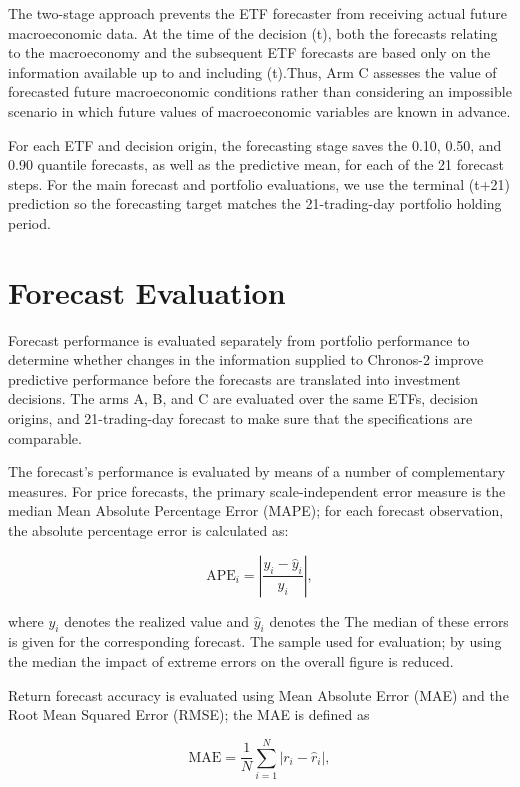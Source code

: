 \documentclass[12pt,a4paper,twoside,openany]{book}
\begin{document}
The two-stage approach prevents the ETF forecaster from receiving actual future macroeconomic data. At the time of the decision (t), both the forecasts relating to the macroeconomy and the subsequent ETF forecasts are based only on the information available up to and including (t).Thus, Arm C assesses the value of forecasted future macroeconomic conditions rather than considering an impossible scenario in which future values of macroeconomic variables are known in advance.


For each ETF and decision origin, the forecasting stage saves the 0.10, 0.50, and 0.90 quantile forecasts, as well as the predictive mean, for each of the 21 forecast steps. For the main forecast and portfolio evaluations, we use the terminal (t+21) prediction so the forecasting target matches the 21-trading-day portfolio holding period.


\section{Forecast Evaluation}\label{forecast-evaluation}

Forecast performance is evaluated separately from portfolio performance
to determine whether changes in the information supplied to
Chronos-2 improve predictive performance before the forecasts are
translated into investment decisions. The arms A, B, and C are evaluated
over the same ETFs, decision origins, and 21-trading-day forecast
to make sure that the specifications are comparable.

The forecast's performance is evaluated by means of a number of complementary measures.
For price forecasts, the primary scale-independent error measure is the
median Mean Absolute Percentage Error (MAPE); for each forecast
observation, the absolute percentage error is calculated as:

\[
\mathrm{APE}_{i}
=
\left|
\frac{y_i-\hat{y}_i}{y_i}
\right|,
\]

where \(y_i\) denotes the realized value and \(\hat{y}_i\) denotes the
The median of these errors is given for the corresponding forecast.
The sample used for evaluation; by using the median the impact of
extreme errors on the overall figure is reduced.

Return forecast accuracy is evaluated using Mean Absolute Error (MAE)
and the Root Mean Squared Error (RMSE); the MAE is defined as

\[
\mathrm{MAE}
=
\frac{1}{N}
\sum_{i=1}^{N}
\left|r_i-\hat{r}_i\right|,
\]
\end{document}
